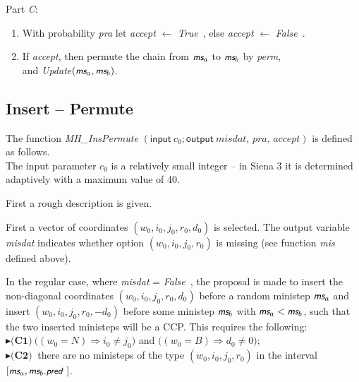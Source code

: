 \documentclass[a4paper,12pt,fleqn]{article}
\newcommand{\nnm}[1]{\textsf{\small\textit{#1}\ }}
\newcommand{\ms}{\textsl{\textsf{\small ms}}} %
\newcommand{\addcc}[1]{{\textcolor[named]{Black}{#1}}}
\begin{document}
Part \emph{C}:
\begin{enumerate}[resume]
\item With probability \textit{pra} let \textit{accept} $\leftarrow$ \nnm{True}, else
      \textit{accept} $\leftarrow$ \nnm{False}.
\item If \textit{accept}, then permute the chain from $\ms_a$ to $\ms_b$ by \textit{perm},\\
      and  \textit{Update}$(\ms_a, \ms_b)$.
\end{enumerate}

\subsection{Insert -- Permute}

The function
\textit{MH\_InsPermute}
$(\textsf{input}\ c_0; %
   \textsf{output}\ \textit{misdat, pra, accept})$
is defined as follows.\\
The input parameter $c_0$ is a relatively small integer --
in Siena 3 it is determined adaptively with a maximum value of 40.

First a rough description is given.
\medskip

First a vector of coordinates $(w_0,i_0,j_0,r_0,d_0)$ is selected.
The output variable \textit{misdat} indicates whether option
$(w_0,i_0,j_0,r_0)$ is missing (see function \textit{mis} defined above).

In the regular case, where \textit{misdat} = \nnm{False},
the proposal is made to insert the non-diagonal coordinates  $(w_0,i_0,j_0,r_0,d_0)$ before
a random ministep $\ms_a$
and insert $(w_0,i_0,j_0,r_0,-d_0)$ before some ministep $\ms_b$
with $\ms_a < \ms_b$,
such that the two inserted ministeps will be a CCP.
This requires the following:\\
$\blacktriangleright \textbf{(C1)}\ \Big((w_0 = N) \Rightarrow i_0 \neq j_0\Big)$ and
     $\Big((w_0 = B) \Rightarrow d_0 \neq 0\Big)$;\\
$\blacktriangleright \textbf{(C2)}\  $ there are no ministeps of  the type  $(w_0,i_0,j_0,r_0)$ in the
interval  $[\ms_a, \ms_b.\nnm{pred}]$.
\end{document}
